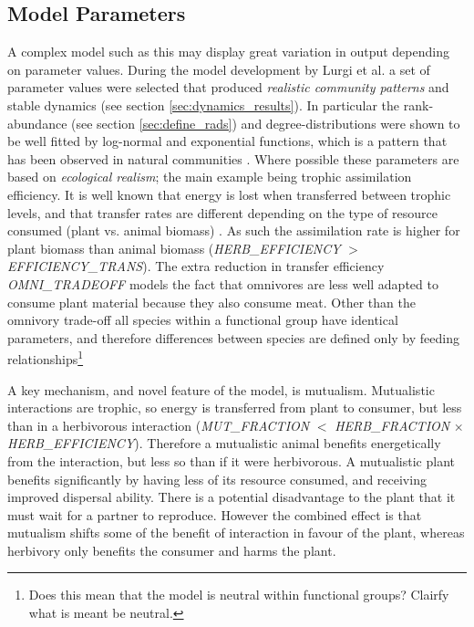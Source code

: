 \subsection{Model Parameters}
\label{sec:parameters}

A complex model such as this may display great variation in output depending on parameter values. During the model development by Lurgi et al. \cite{lurgi2015} a set of parameter values were selected that produced \emph{realistic community patterns} and stable dynamics (see section \ref{sec:dynamics_results}). In particular the rank-abundance (see section \ref{sec:define_rads}) and degree-distributions were shown to be well fitted by log-normal and exponential functions, which is a pattern that has been observed in natural communities \cite{montoya2006ecological}. Where possible these parameters are based on \emph{ecological realism}; the main example being trophic assimilation efficiency. It is well known that energy is lost when transferred between trophic levels, and that transfer rates are different depending on the type of resource consumed (plant vs. animal biomass) \cite{ings2009review}. As such the assimilation rate is higher for plant biomass than animal biomass (\emph{HERB\_EFFICIENCY} $>$ \emph{EFFICIENCY\_TRANS}). The extra reduction in transfer efficiency \emph{OMNI\_TRADEOFF} models the fact that omnivores are less well adapted to consume plant material because they also consume meat. Other than the omnivory trade-off all species within a functional group have identical parameters, and therefore differences between species are defined only by feeding relationships\footnote{Does this mean that the model is neutral within functional groups? Clairfy what is meant be neutral.}

A key mechanism, and novel feature of the model, is mutualism. Mutualistic interactions are trophic, so energy is transferred from plant to consumer, but less than in a herbivorous interaction (\emph{MUT\_FRACTION} $<$ \emph{HERB\_FRACTION} $\times$ \emph{HERB\_EFFICIENCY}). Therefore a mutualistic animal benefits energetically from the interaction, but less so than if it were herbivorous. A mutualistic plant benefits significantly by having less of its resource consumed, and receiving improved dispersal ability. There is a potential disadvantage to the plant that it must wait for a partner to reproduce. However the combined effect is that mutualism shifts some of the benefit of interaction in favour of the plant, whereas herbivory only benefits the consumer and harms the plant.  

